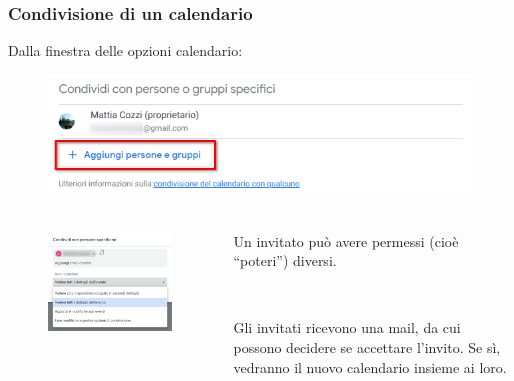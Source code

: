 \documentclass[]{beamer}
\begin{document}
\begin{frame}
\frametitle{Condivisione di un calendario}
Dalla finestra delle opzioni calendario:
\begin{figure}
  \includegraphics[width=.5\columnwidth]{img/calendarshare.png}
\end{figure}

\begin{columns}
  \begin{column}{.5\textwidth}
    \begin{figure}
      \includegraphics[width=\columnwidth]{img/calendarshare2.png}
    \end{figure}
  \end{column}
  \begin{column}{.4\textwidth}
    Un invitato può avere permessi (cioè ``poteri'') diversi.

    ~

    Gli invitati ricevono una mail, da cui possono decidere se accettare l'invito. Se sì, vedranno il nuovo calendario insieme ai loro.
  \end{column}
\end{columns}
\end{frame}
\end{document}
